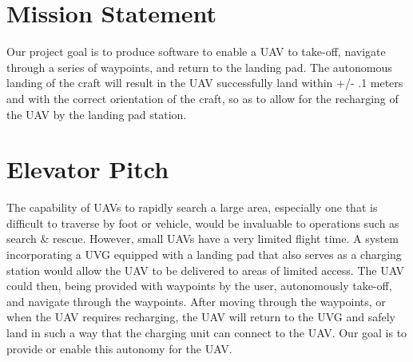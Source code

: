 
\section{Mission Statement}
Our project goal is to produce software to enable a UAV to take-off, navigate through a series of waypoints, and return to the landing pad. The autonomous landing of the craft will result in the UAV successfully land within +/- .1 meters and with the correct orientation of the craft, so as to allow for the recharging of the UAV by the landing pad station.\\

\section{Elevator Pitch}
The capability of UAVs to rapidly search a large area, especially one that is difficult to traverse by foot or vehicle, would be invaluable to operations such as search \& rescue. However, small UAVs have a very limited flight time. A system incorporating a UVG equipped with a landing pad that also serves as a charging station would allow the UAV to be delivered to areas of limited access. The UAV could then, being provided with waypoints by the user, autonomously take-off, and navigate through the waypoints. After moving through the waypoints, or when the UAV requires recharging, the UAV will return to the UVG and safely land in such a way that the charging unit can connect to the UAV. Our goal is to provide or enable this autonomy for the UAV.